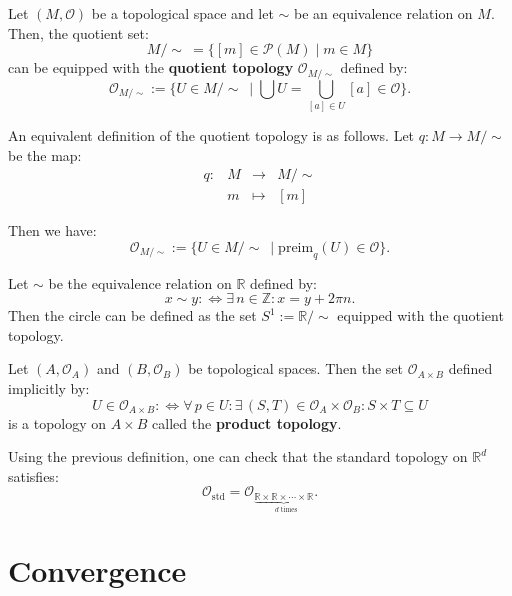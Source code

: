 \documentclass[root.tex]{subfiles}
\begin{document}
\begin{mydef}
Let $(M,\mathcal{O})$ be a topological space and let $\sim$ be an equivalence relation on $M$. Then, the quotient set:
$$
M/\!\sim \ = \{[m]\in \mathcal{P}(M) \mid m \in M\}
$$
can be equipped with the \textbf{quotient topology} $\mathcal{O}_{M/\sim}$ defined by:
$$
\mathcal{O}_{M/\sim} := \{U \in M/\!\sim \ \mid \bigcup U = \bigcup_{[a]\in U}[a] \in \mathcal{O} \}.
$$
\end{mydef}

An equivalent definition of the quotient topology is as follows. Let $q: M \to M/\!\sim$ be the map:
\begin{equation}
  \begin{aligned}
q : & M & \to & M/\!\sim \\
& m & \mapsto & [m]
  \end{aligned}
\end{equation}

Then we have:
$$
\mathcal{O}_{M/\!\sim} := \{U \in M/\!\sim \ \mid \mathrm{preim}_q(U) \in \mathcal{O} \}.
$$

\begin{myex}
Let $\sim$ be the equivalence relation on $\mathbb{R}$ defined by:
$$
x\sim y :\Leftrightarrow \exists \, n \in \mathbb{Z} : x = y + 2\pi n. 
$$
Then the circle can be defined as the set $S^1:=\mathbb{R}/\!\sim$ equipped with the quotient topology.
\end{myex}


\begin{mydef}
Let $(A,\mathcal{O}_A)$ and $(B,\mathcal{O}_B)$ be topological spaces. Then the set $\mathcal{O}_{A\times B}$ defined implicitly by:
$$
U \in \mathcal{O}_{A\times B} :\Leftrightarrow \forall \, p \in U : \exists \, (S,T) \in \mathcal{O}_A\times \mathcal{O}_B : S\times T \subseteq U
$$
is a topology on $A\times B$ called the \textbf{product topology}.
\end{mydef}


\begin{remark}
Using the previous definition, one can check that the standard topology on $\mathbb{R}^d$ satisfies:
$$
\mathcal{O}_\mathrm{std} = \mathcal{O}_{\underbrace{\scriptstyle \mathbb{R} \times\mathbb{R}\times\cdots\times\mathbb{R}}_\text{ $d$ times}}.
$$

\end{remark}


\section{Convergence}
\end{document}

